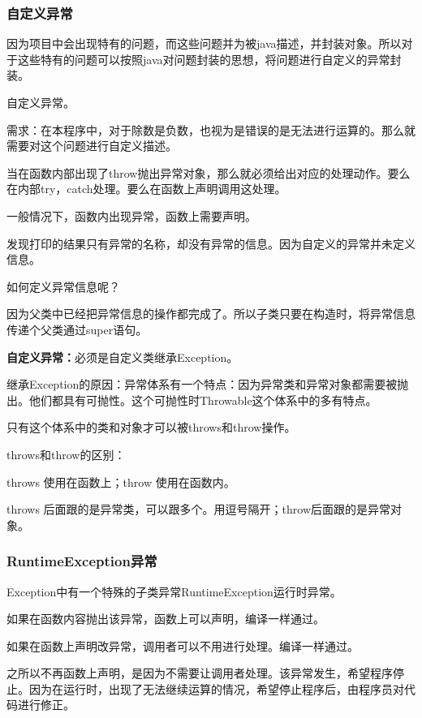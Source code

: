 \documentclass[UTF8]{ctexart}
\begin{document}
\subsubsection{自定义异常}

因为项目中会出现特有的问题，而这些问题并为被java描述，并封装对象。所以对于这些特有的问题可以按照java对问题封装的思想，将问题进行自定义的异常封装。

自定义异常。

需求：在本程序中，对于除数是负数，也视为是错误的是无法进行运算的。那么就需要对这个问题进行自定义描述。

当在函数内部出现了throw抛出异常对象，那么就必须给出对应的处理动作。要么在内部try，catch处理。要么在函数上声明调用这处理。

一般情况下，函数内出现异常，函数上需要声明。

发现打印的结果只有异常的名称，却没有异常的信息。因为自定义的异常并未定义信息。

如何定义异常信息呢？

因为父类中已经把异常信息的操作都完成了。所以子类只要在构造时，将异常信息传递个父类通过super语句。

\textbf{自定义异常：}必须是自定义类继承Exception。

继承Exception的原因：异常体系有一个特点：因为异常类和异常对象都需要被抛出。他们都具有可抛性。这个可抛性时Throwable这个体系中的多有特点。

只有这个体系中的类和对象才可以被throws和throw操作。

throws和throw的区别：

\textbullet throws 使用在函数上；throw 使用在函数内。

\textbullet throws 后面跟的是异常类，可以跟多个。用逗号隔开；throw后面跟的是异常对象。



\subsubsection{RuntimeException异常}

Exception中有一个特殊的子类异常RuntimeException运行时异常。

如果在函数内容抛出该异常，函数上可以声明，编译一样通过。

如果在函数上声明改异常，调用者可以不用进行处理。编译一样通过。

之所以不再函数上声明，是因为不需要让调用者处理。该异常发生，希望程序停止。因为在运行时，出现了无法继续运算的情况，希望停止程序后，由程序员对代码进行修正。
\end{document}
